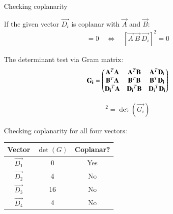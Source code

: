 \documentclass{beamer}
\begin{document}
\begin{frame}{Checking coplanarity}


If the given vector $\vec{D_i}$ is coplanar with $\vec{A}$ and $\vec{B}$:
\begin{align}
  [\vec{A}\ \vec{B}\ \vec{D_i}] = 0 \quad \Longleftrightarrow \quad [\vec{A}\ \vec{B}\ \vec{D_i}]^2 = 0
\end{align}

The determinant test via Gram matrix:
\begin{align}
    \mathbf{G_i} = \begin{pmatrix}
    {\mathbf{A}}^T\mathbf{A} & {\mathbf{A}}^T\mathbf{B} & {\mathbf{A}}^T\mathbf{D_i} \\
    {\mathbf{B}}^T\mathbf{A} & {\mathbf{B}}^T\mathbf{B} & {\mathbf{B}}^T\mathbf{D_i} \\
    {\mathbf{D_i}}^T\mathbf{A} & {\mathbf{D_i}}^T\mathbf{B} & {\mathbf{D_i}}^T\mathbf{D_i}
    \end{pmatrix}
\end{align}

\begin{align}
    [\vec{A}\ \vec{B}\ \vec{D_i}]^2 = \det(\vec{G_i})
\end{align}

\end{frame}
\begin{frame}
Checking coplanarity for all four vectors:
\begin{center}
\begin{tabular}{|c|c|c|}
\hline
Vector & $\det(G)$ & Coplanar? \\ \hline
$\vec{D_1}$ & 0  & Yes \\ \hline
$\vec{D_2}$ & 4  & No  \\ \hline
$\vec{D_3}$ & 16 & No  \\ \hline
$\vec{D_4}$ & 4  & No  \\ \hline
\end{tabular}
\end{center}
\end{frame}
\end{document}
